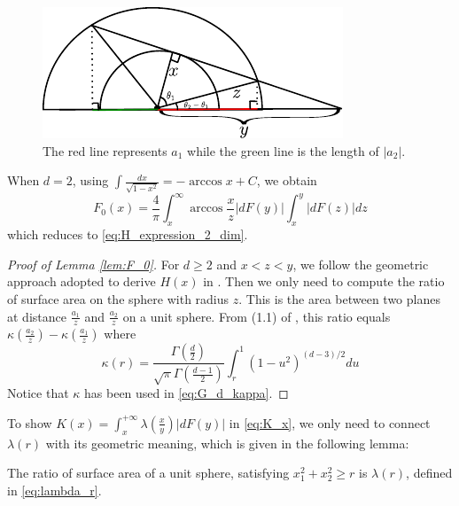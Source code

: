\documentclass{aptpub}
\begin{document}
\begin{figure}[!ht]
     \centering
     \includegraphics[width=0.8\textwidth]{dessin.pdf}
     \caption{The red line represents $a_1$ while the green line is the length of $|a_2|$.}
     \label{fig:a1a2}
\end{figure}
When $d=2$, using $\int \frac{dx}{\sqrt{1-x^2}} = -\arccos x + C$,
we obtain
$$
F_0(x)=\frac{4}{\pi} \int_x^{\infty} \arccos\frac{x}{z}|dF(y)|
\int_x^{y} |dF(z)|dz
$$
which reduces to \eqref{eq:H_expression_2_dim}.
\begin{proof}[Proof of Lemma \ref{lem:F_0}]
For $d\geq 2$ and $x<z<y$, we follow the geometric approach adopted to derive
$H(x)$ in \cite{carnal1970konvexe}.
Then we only need to compute the ratio of surface area
on the sphere with radius $z$. This is the area between
two planes at distance $\frac{a_1}{z}$ and $\frac{a_2}{z}$
on a unit sphere. From (1.1) of \cite{dwyer1991convex},
this ratio equals $\kappa(\frac{a_2}{z}) - \kappa(\frac{a_1}{z})$
where
\begin{equation}
     \kappa(r) = \frac{\Gamma(\frac{d}{2})}
     {\sqrt{\pi}\Gamma(\frac{d-1}{2})}\int_r^{1}
     (1-u^2)^{(d-3)/2}du
\end{equation}
Notice that $\kappa$ has been used in \eqref{eq:G_d_kappa}.
\end{proof}
To show 
$K(x) = \int_x^{+\infty} \lambda(\frac{x}{y})|dF(y)|$
in \eqref{eq:K_x},
we only need to connect $\lambda(r)$ with its geometric meaning,
which is given in the following lemma:
\begin{lemma}
     The ratio of surface area of a unit sphere,
     satisfying $x_1^2+x_2^2\geq r$ is $\lambda(r)$,
     defined in \eqref{eq:lambda_r}.
\end{lemma}
\end{document}
